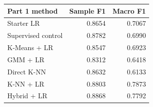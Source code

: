 \begin{tabular}{lrr}
\toprule
Part 1 method & Sample F1 & Macro F1 \\
\midrule
Starter LR & 0.8654 & 0.7067 \\
Supervised control & 0.8782 & 0.6990 \\
K-Means + LR & 0.8547 & 0.6923 \\
GMM + LR & 0.8312 & 0.6418 \\
Direct K-NN & 0.8632 & 0.6133 \\
K-NN + LR & 0.8803 & 0.7873 \\
Hybrid + LR & 0.8868 & 0.7792 \\
\bottomrule
\end{tabular}
